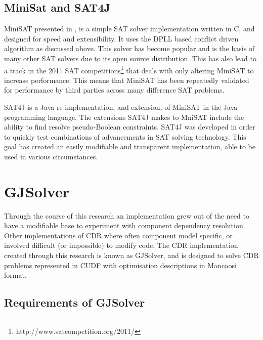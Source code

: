 \subsection{MiniSat and SAT4J}
MiniSAT presented in \citep{een2003}, is a simple SAT solver implementation written in C, and designed for speed and extensibility.
It uses the DPLL based conflict driven algorithm as discussed above.
This solver has become popular and is the basis of many other SAT solvers due to its open source distribution.
This has also lead to a track in the 2011 SAT competitions\footnote{http://www.satcompetition.org/2011/} that deals with only altering MiniSAT to increase performance.
This means that MiniSAT has been repeatedly validated for performance by third parties across many difference SAT problems. 

SAT4J \citep{le2010sat4j} is a Java re-implementation, and extension, of MiniSAT in the Java programming language.
The extensions SAT4J makes to MniSAT include the ability to find resolve pseudo-Boolean constraints.
SAT4J was developed in order to quickly test combinations of advancements in SAT solving technology.
This goal has created an easily modifiable and transparent implementation, able to be used in various circumstances.

\section{GJSolver}
Through the course of this research an implementation grew out of the need to have a modifiable base to experiment with component dependency resolution.
Other implementations of CDR where often component model specific, or involved difficult (or impossible) to modify code.
The CDR implementation created through this research is known as GJSolver, 
and is designed to solve CDR problems represented in CUDF with optimisation descriptions in Mancoosi format.

\subsection{Requirements of GJSolver}

